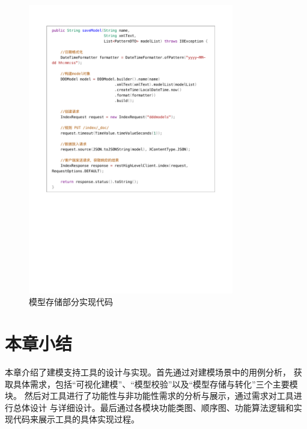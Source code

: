 \begin{figure}[!htbp] %
    \centering %
    \includegraphics[width=0.8\textwidth]{FIGs/chapter4/saveModelcode.pdf} %
    \caption{模型存储部分实现代码} %
    \label{saveModelcode} %
\end{figure}%

\section{本章小结}

本章介绍了建模支持工具的设计与实现。首先通过对建模场景中的用例分析，
获取具体需求，包括“可视化建模”、“模型校验”以及“模型存储与转化”三个主要模块。
然后对工具进行了功能性与非功能性需求的分析与展示，通过需求对工具进行总体设计
与详细设计。最后通过各模块功能类图、顺序图、功能算法逻辑和实现代码来展示工具的具体实现过程。

